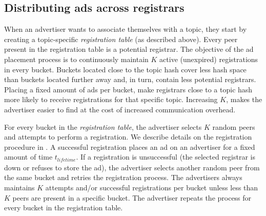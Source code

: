 
\subsection{Distributing ads across registrars}\label{sec:registration_multi}
When an advertiser wants to associate themselves with a topic, they start by creating a topic-specific \emph{registration table} (as described above). 
Every peer present in the registration table is a potential registrar. 
The objective of the ad placement process is to continuously maintain $K$ active (\ie unexpired) registrations in every bucket. 
Buckets located close to the topic hash cover less hash space than buckets located further away and, in turn, contain less potential registrars. 
Placing a fixed amount of ads per bucket, make registrars close to a topic hash more likely to receive registrations for that specific topic. 
Increasing $K$, makes the advertiser easier to find at the cost of increased communication overhead. 

For every bucket in the \emph{registration table}, the advertiser selects $K$ random peers and attempts to perform a registration. 
We describe details on the registration procedure in . 
A successful registration places an ad on an advertiser for a fixed amount of time $t_\textit{lifetime}$.
If a registration is unsuccessful (the selected registrar is down or refuses to store the ad), the advertiser selects another random peer from the same bucket and retries the registration process. 
The advertisers always maintains $K$ attempts and/or successful registrations per bucket unless less than $K$ peers are present in a specific bucket. 
The advertiser repeats the process for every bucket in the registration table. 

